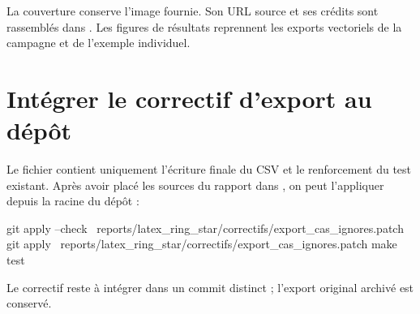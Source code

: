 La couverture conserve l'image fournie. Son URL source et ses crédits
sont rassemblés dans . Les figures de résultats
reprennent les exports vectoriels de la campagne et de l'exemple individuel.

\section{Intégrer le correctif d'export au dépôt}
Le fichier  contient uniquement
l'écriture finale du CSV et le renforcement du test existant. Après avoir
placé les sources du rapport dans ,
on peut l'appliquer depuis la racine du dépôt :
\begin{commandes}
git apply --check \
  reports/latex_ring_star/correctifs/export_cas_ignores.patch
git apply \
  reports/latex_ring_star/correctifs/export_cas_ignores.patch
make test
\end{commandes}
Le correctif reste à intégrer dans un commit distinct ; l'export original
archivé est conservé.
